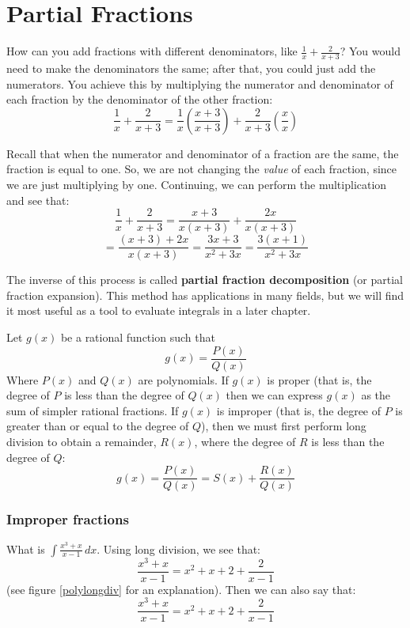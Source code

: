 \chapter{Partial Fractions}

How can you add fractions with different denominators, like $\frac{1}{x} + 
\frac{2}{x + 3}$? You would need to make the denominators the same; after that, you 
could just add the numerators. You achieve this by multiplying the numerator 
and denominator of each fraction by the denominator of the other fraction:
$$\frac{1}{x} + \frac{2}{x + 3} = \frac{1}{x} \left( \frac{x + 3}{x + 3} 
\right) + \frac{2}{x + 3} \left( \frac{x}{x} \right)$$

Recall that when the numerator and denominator of a fraction are the same, the 
fraction is equal to one. So, we are not changing the \textit{value} of each 
fraction, since we are just multiplying by one. Continuing, we can perform the 
multiplication and see that:
$$\frac{1}{x} + \frac{2}{x + 3} = \frac{x + 3}{x(x + 3)} + \frac{2x}{x(x + 3)}$$
$$= \frac{(x + 3) + 2x}{x(x + 3)} = \frac{3x + 3}{x^2 + 3x} = \frac{3(x + 1)}{x
^2 + 3x}$$

The inverse of this process is called \textbf{partial fraction decomposition} 
(or partial fraction expansion). This 
method has applications in many fields, but we will find it most useful as a 
tool to evaluate integrals in a later chapter. 


Let $g(x)$ be a rational function such that 
$$g(x) = \frac{P(x)}{Q(x)}$$
Where $P(x)$ and $Q(x)$ are polynomials. If $g(x)$ is proper (that is, the 
degree of $P$ is less than the degree of $Q(x)$ then we can express $g(x)$ as 
the sum of simpler rational fractions. If $g(x)$ is improper (that is, the 
degree of $P$ is greater than or equal to the degree of $Q$), then we must 
first perform long division to obtain a remainder, $R(x)$, where the degree 
of $R$ is less than the degree of $Q$:
$$g(x) = \frac{P(x)}{Q(x)} = S(x) + \frac{R(x)}{Q(x)}$$

\subsection{Improper fractions}
What is $\int \frac{x^3 + x}{x-1}\,dx$. Using long division, we see that:
$$\frac{x^3 + x}{x - 1} = x^2 + x + 2 + \frac{2}{x - 1}$$
(see figure \ref{polylongdiv} for an explanation). Then we can also say that:
$$\frac{x^3 + x}{x-1} = x^2 + x + 2 + \frac{2}{x-1}$$

